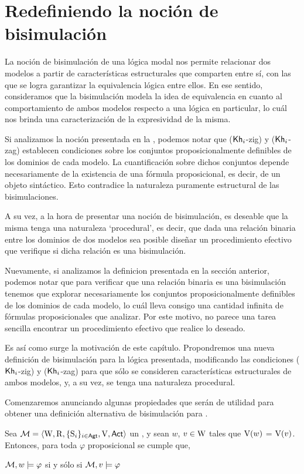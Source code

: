 \chapter{Redefiniendo la noción de bisimulación}

La noción de bisimulación de una lógica modal nos permite relacionar dos modelos a partir de características estructurales 
que comparten entre sí, con las que se logra garantizar la equivalencia lógica entre ellos. En ese sentido, consideramos que la 
bisimulación modela la idea de equivalencia en cuanto al comportamiento de ambos modelos respecto a una lógica en particular, lo cuál nos brinda
una caracterización de la expresividad de la misma.

Si analizamos la noción presentada en la , podemos notar que ($\mathsf{Kh}_i$-zig) y ($\mathsf{Kh}_i$-zag) establecen condiciones 
sobre los conjuntos proposicionalmente definibles de los dominios de cada modelo. La cuantificación sobre dichos conjuntos depende necesariamente
de la existencia de una fórmula proposicional, es decir, de un objeto sintáctico. Esto contradice la naturaleza puramente estructural 
de las bisimulaciones. 

A su vez, a la hora de presentar una noción de bisimulación, es deseable que la misma tenga una naturaleza `procedural', es decir,
que dada una relación binaria entre los dominios de dos modelos sea posible diseñar un procedimiento efectivo que verifique si dicha relación 
es una bisimulación.

Nuevamente, si analizamos la definicion presentada en la sección anterior, podemos notar que para verificar que una relación binaria es una bisimulación
tenemos que explorar necesariamente los conjuntos proposicionalmente definibles de los dominios de cada modelo, lo cuál lleva consigo una cantidad 
infinita de fórmulas proposicionales que analizar. Por este motivo, no parece una tarea sencilla encontrar un procedimiento efectivo que realice lo deseado.

Es así como surge la motivación de este capítulo. Propondremos una nueva definición de bisimulación para la lógica presentada, modificando las condiciones
($\mathsf{Kh}_i$-zig) y ($\mathsf{Kh}_i$-zag) para que sólo se consideren características estructurales de ambos modelos, y, a su vez, se tenga una naturaleza procedural.

Comenzaremos anunciando algunas propiedades que serán de utilidad para obtener una definición alternativa de bisimulación para \KHilogic.

\begin{lema}\label{lema:propositional-equivalence}
    Sea $\mathcal{M}=\langle \mathrm{W},\mathrm{R},\{ \mathrm{S}_i \}_{i \in {\rm \sf Agt}},\mathrm{V},{\rm \sf Act} \rangle$ un \ults, y sean $w$, $v \in \mathrm{W}$
    tales que $\mathrm{V}(w)$ = $\mathrm{V}(v)$. Entonces, para toda $\varphi$ proposicional se cumple que, 
    \begin{center}
    $\mathcal{M}, w \models \varphi$ \quad si y sólo si \quad $ 
    \mathcal{M}, v \models \varphi$
    \end{center}
\end{lema}

